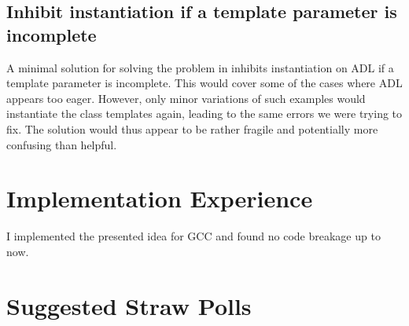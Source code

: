 \subsection{Inhibit instantiation if a template parameter is incomplete}

A minimal solution for solving the problem in  inhibits instantiation on ADL 
if a template parameter is incomplete. This would cover some of the cases where ADL 
appears too eager. However, only minor variations of such examples would instantiate the 
class templates again, leading to the same errors we were trying to fix. The solution 
would thus appear to be rather fragile and potentially more confusing than helpful.

\section{Implementation Experience}
I implemented the presented idea for GCC and found no code breakage up to now.

\section{Suggested Straw Polls}


